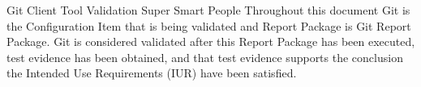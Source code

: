 \documentclass[10pt]{tlc-article}
\begin{document}
  \global\def\configurationitem{Git}

  \tlcTitlePageAndTableOfContents
    {Git Client Tool Validation}
    {Super Smart People}
    {Throughout this document Git is the Configuration Item that is being
     validated and Report Package is Git Report Package.  Git is
     considered validated after this Report Package has been executed, test
     evidence has been obtained, and that test evidence supports the conclusion
     the Intended Use Requirements (IUR) have been satisfied.}

  
\end{document}
